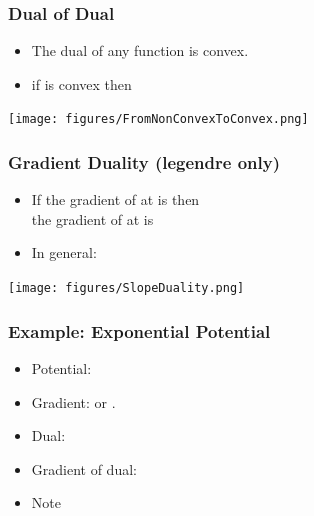 \documentclass{beamer}
\begin{document}
\begin{small}
\begin{frame}
  \frametitle{Dual of Dual}
  \begin{itemize}
  \item The dual of any function is convex.
  \item if  is convex then 
  \end{itemize}
  \texttt{[image: figures/FromNonConvexToConvex.png]}  
\end{frame}

\begin{frame}
  \frametitle{Gradient Duality (legendre only)}
  \begin{itemize}
  \item
    If the gradient of  at  is  then\\
    the gradient of  at  is 
    \item In general:
  \end{itemize}
  \texttt{[image: figures/SlopeDuality.png]}
\end{frame}

\begin{frame}
  \frametitle{Example: Exponential Potential}
  \begin{itemize}
  \item Potential: 
  \item Gradient:  or .
  \item Dual:  
  \item Gradient of dual:  
  \item Note 
   \end{itemize}
 \end{frame}


\end{small}
\end{document}
